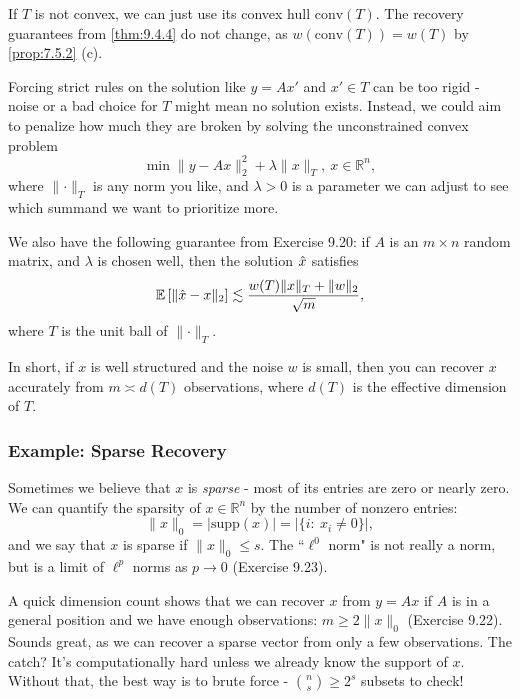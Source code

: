 \begin{remark}
\label{rmk:9.4.6}
If $T$ is not convex, we can just use its convex hull $\mathrm{conv}(T)$. The recovery guarantees from 
\cref{thm:9.4.4} do not change, as $w(\mathrm{conv}(T)) = w(T)$ by \cref{prop:7.5.2} (c).
\end{remark}

\begin{remark}
\label{rmk:9.4.7}
Forcing strict rules on the solution like $y = Ax'$ and $x' \in T$ can be too rigid - noise or a bad choice for 
$T$ might mean no solution exists. Instead, we could aim to penalize how much they are broken by solving the 
unconstrained convex problem 
\[ \min_{}\lVert y - Ax \rVert_{2}^2 + \lambda \lVert x \rVert_{T}, \ x \in \mathbb{R}^n, \]
where $\lVert \cdot \rVert_{T}$ is any norm you like, and $\lambda > 0$ is a parameter we can adjust to see 
which summand we want to prioritize more.
\end{remark}


We also have the following guarantee from Exercise 9.20: if $A$ is an $m \times n$ random matrix, and $\lambda$ 
is chosen well, then the solution $\Hat{x}$ satisfies 
\[ \mathbb{E}\left[ \lVert \Hat{x} - x \rVert_{2} \right] \lesssim 
\frac{w(T)\lVert x \rVert_{T} + \lVert w \rVert_{2}}{\sqrt{m}}, \]
where $T$ is the unit ball of $\lVert \cdot \rVert_{T}$. 

In short, if $x$ is well structured and the noise $w$ is small, then you can recover $x$ accurately from 
$m \asymp d(T)$ observations, where $d(T)$ is the effective dimension of $T$.


\subsubsection{Example: Sparse Recovery}
Sometimes we believe that $x$ is \textit{sparse} - most of its entries are zero or nearly zero. We can 
quantify the sparsity of $x \in \mathbb{R}^n$ by the number of nonzero entries:
\[ \lVert x \rVert_{0} = |\mathrm{supp}(x)| = |\{ i: \ x_i \neq 0 \}|, \]
and we say that $x$ is sparse if $\lVert x \rVert_{0} \leq s$. The ``$\ell^0$ norm" is not really a norm, but 
is a limit of $\ell^p$ norms as $p \to 0$ (Exercise 9.23).

A quick dimension count shows that we can recover $x$ from $y = Ax$ if $A$ is in a general position and we have 
enough observations: $m \geq 2 \lVert x \rVert_{0}$ (Exercise 9.22). Sounds great, as we can recover a sparse 
vector from only a few observations. The catch? It's computationally hard unless we already know the support of 
$x$. Without that, the best way is to brute force - $\binom{n}{s} \geq 2^s$ subsets to check!

